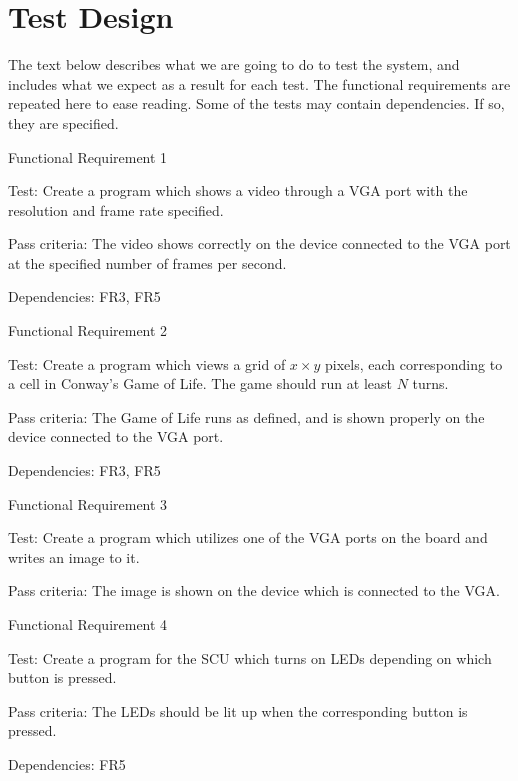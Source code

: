 \section{Test Design}

The text below describes what we are going to do to test the system, and
includes what we expect as a result for each test. The functional requirements
are repeated here to ease reading. Some of the tests may contain
dependencies\footnotemark. If so, they are specified.


{\sc Functional Requirement 1}
\begin{Test}
  {\em \FRI}

  {\sc Test:} Create a program which shows a video through a \ac{VGA} port with
  the resolution and frame rate specified.

  {\sc Pass criteria:} The video shows correctly on the device connected to the
  \ac{VGA} port at the specified number of frames per second.
  
  {\sc Dependencies:} FR3, FR5
\end{Test}

{\sc Functional Requirement 2}
\begin{Test}
  {\em \FRII}
  
  {\sc Test:} Create a program which views a grid of $x \times y$ pixels, each
  corresponding to a cell in Conway's Game of
  Life\cite{gardner1970mathematical}. The game should run at least $N$ turns.

  {\sc Pass criteria:} The Game of Life runs as defined, and is shown properly
  on the device connected to the \ac{VGA} port.

  {\sc Dependencies:} FR3, FR5
\end{Test}

{\sc Functional Requirement 3}
\begin{Test}
  {\em \FRIII}
  
  {\sc Test:} Create a program which utilizes one of the \ac{VGA} ports on the
  board and writes an image to it.

  {\sc Pass criteria:} The image is shown on the device which is connected to
  the \ac{VGA}.
\end{Test}

{\sc Functional Requirement 4}
\begin{Test}
  {\em \FRIV}
  
  {\sc Test:} Create a program for the \ac{SCU} which turns on \acp{LED}
  depending on which button is pressed.

  {\sc Pass criteria:} The \acp{LED} should be lit up when the corresponding
  button is pressed.

  {\sc Dependencies:} FR5
\end{Test}

